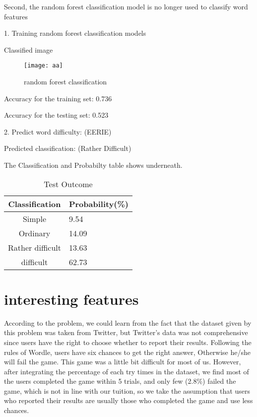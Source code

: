 \documentclass{mcmthesis}
\begin{document}
Second, the random forest classification model is no longer used to classify word
features


1. Training random forest classification models

Classified image


\begin{figure}[h]
\small
\centering
\texttt{[image: aa]}
\caption{random forest classification} \label{fig:aa}
\end{figure}

Accuracy for the training set: 0.736

Accuracy for the testing set: 0.523

2. Predict word difficulty: (EERIE)

Predicted classification: (Rather Difficult)

The Classification and Probabilty table shows underneath.

\begin{table}[!htbp]
\begin{center}
\caption{Test Outcome}
\begin{tabular}{cl}
 \toprule
 \multicolumn{1}{m{3cm}}{\centering Classification}
 &\multicolumn{1}{m{4cm}}{\centering Probability(\%)}\\
 \midrule
Simple &   \hspace*{32.2} 9.54 \\
  Ordinary & \hspace*{32.2}   14.09 \\
  Rather difficult & \hspace*{32.2}   13.63 \\
  difficult & \hspace*{32.2}   62.73 \\\bottomrule
\end{tabular}\label{tb:notation}
\end{center}
\end{table}


\section{interesting features}
\hspace*{0.6cm}According to the problem, we could learn from the fact that the dataset given by this problem was taken from Twitter, but Twitter's data was not comprehensive since  users have the right to choose whether to report their results. Following the rules of Wordle, users have six chances to get the right answer, Otherwise he/she will fail the game. This game was a little bit difficult for most of us. However, after integrating the percentage of each try times in the dataset, we find most of the users completed the game within 5 trials, and only few (2.8\%) failed the game, which is not in line with our tuition, so we take the assumption that users who reported their results are usually those who completed the game and use less chances.
\end{document}
